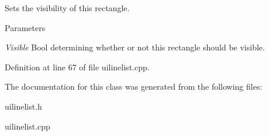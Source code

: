 Sets the visibility of this rectangle. 


\begin{DoxyParams}{Parameters}
\item[{\em Visible}]Bool determining whether or not this rectangle should be visible. \end{DoxyParams}


Definition at line 67 of file uilinelist.cpp.



The documentation for this class was generated from the following files:\begin{DoxyCompactItemize}
\item 
uilinelist.h\item 
uilinelist.cpp\end{DoxyCompactItemize}
